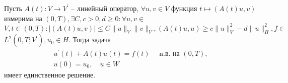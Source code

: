 \begin{theorem}
    \label{th:1_7:7}\cite[426]{Zeidler1990a}
    Пусть $A(t): V \rightarrow V^{\prime}$ -- линейный оператор,
    $\forall u, v \in V$ функция $t \mapsto(A(t) u, v)$
    измерима на $(0, T), \exists C, c>0, d \geq 0:
    \forall u, v \in$ $V, t \in(0, T):|(A(t) u, v)|
    \leq C\|u\|_{V}\|v\|_{V},(A(t) u, u)
    \geq c\|u\|_{V}^{2}-d\|u\|_{H}^{2},
    f \in$ $L^{2}\left(0, T ; V^{\prime}\right), u_{0} \in H$.
    Тогда задача
    \[
        \begin{gathered}
            u^{\prime}(t)+A(t) u(t)=f(t) \quad \text { n.в. на }(0, T),\\
            u(0)=u_{0}, \quad u \in W
        \end{gathered}
    \]
    имеет единственное решение.
\end{theorem}
